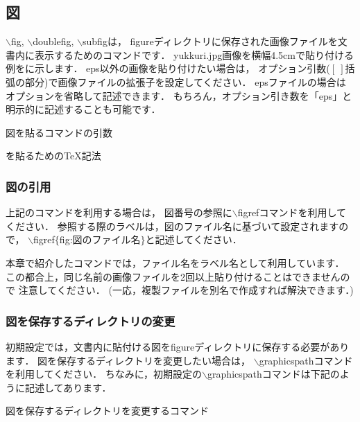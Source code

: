 \subsection{図}
$\backslash$fig, $\backslash$doublefig, $\backslash$subfigは，
figureディレクトリに保存された画像ファイルを文書内に表示するためのコマンドです．
yukkuri.jpg画像を横幅4.5cmで貼り付ける例をに示します．
eps以外の画像を貼り付けたい場合は，
オプション引数($[\ ]$括弧の部分)で画像ファイルの拡張子を設定してください．
epsファイルの場合はオプションを省略して記述できます．
もちろん，オプション引き数を「eps」と明示的に記述することも可能です．
%
\begin{lstbox}{図を貼るコマンドの引数}
\begin{minilst}
\end{minilst}
\end{lstbox}
%
%
\begin{lstbox}{を貼るためのTeX記法}
\begin{minilst}
\end{minilst}
\end{lstbox}

\subsubsection{図の引用}
上記のコマンドを利用する場合は，
図番号の参照に$\backslash$figrefコマンドを利用してください．
参照する際のラベルは，図のファイル名に基づいて設定されますので，
$\backslash$figref$\{$fig:図のファイル名$\}$と記述してください．

本章で紹介したコマンドでは，ファイル名をラベル名として利用しています．
この都合上，同じ名前の画像ファイルを2回以上貼り付けることはできませんので
注意してください．
(一応，複製ファイルを別名で作成すれば解決できます．)

\subsubsection{図を保存するディレクトリの変更}
初期設定では，文書内に貼付ける図をfigureディレクトリに保存する必要があります．
図を保存するディレクトリを変更したい場合は，
$\backslash$graphicspathコマンドを利用してください．
ちなみに，初期設定の$\backslash$graphicspathコマンドは下記のように記述してあります．
\begin{lstbox}{図を保存するディレクトリを変更するコマンド}
\begin{minilst}
\graphicspath{{./figure/}}
\end{minilst}
\end{lstbox}
